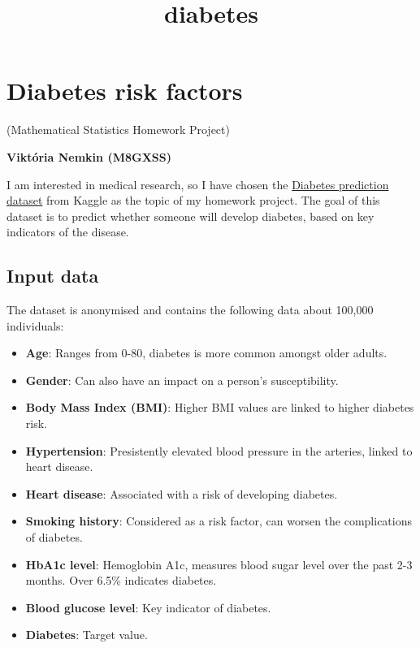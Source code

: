\documentclass[11pt]{article}
\title{diabetes}
\providecommand{\tightlist}{%
      \setlength{\itemsep}{0pt}\setlength{\parskip}{0pt}}
\begin{document}
    
    \maketitle
    
    

    
    \hypertarget{diabetes-risk-factors}{%
\section{Diabetes risk factors}\label{diabetes-risk-factors}}

(Mathematical Statistics Homework Project)

\textbf{Viktória Nemkin (M8GXSS)}

I am interested in medical research, so I have chosen the
\href{https://www.kaggle.com/datasets/iammustafatz/diabetes-prediction-dataset}{Diabetes
prediction dataset} from Kaggle as the topic of my homework project. The
goal of this dataset is to predict whether someone will develop
diabetes, based on key indicators of the disease.

    \hypertarget{input-data}{%
\subsection{Input data}\label{input-data}}

The dataset is anonymised and contains the following data about 100,000
individuals:

\begin{itemize}
\tightlist
\item
  \textbf{Age}: Ranges from 0-80, diabetes is more common amongst older
  adults.
\item
  \textbf{Gender}: Can also have an impact on a person's susceptibility.
\item
  \textbf{Body Mass Index (BMI)}: Higher BMI values are linked to higher
  diabetes risk.
\item
  \textbf{Hypertension}: Presistently elevated blood pressure in the
  arteries, linked to heart disease.
\item
  \textbf{Heart disease}: Associated with a risk of developing diabetes.
\item
  \textbf{Smoking history}: Considered as a risk factor, can worsen the
  complications of diabetes.
\item
  \textbf{HbA1c level}: Hemoglobin A1c, measures blood sugar level over
  the past 2-3 months. Over 6.5\% indicates diabetes.
\item
  \textbf{Blood glucose level}: Key indicator of diabetes.
\item
  \textbf{Diabetes}: Target value.
\end{itemize}
\end{document}

